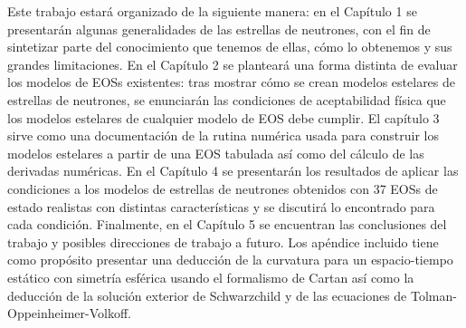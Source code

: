 Este trabajo estará organizado de la siguiente manera: en el Capítulo 1 se presentarán algunas generalidades de las estrellas de neutrones, con el fin de sintetizar parte del conocimiento que tenemos de ellas, cómo lo obtenemos y sus grandes limitaciones. En el Capítulo 2 se planteará una forma distinta de evaluar los modelos de EOSs existentes: tras mostrar cómo se crean modelos estelares de estrellas de neutrones, se enunciarán las condiciones de aceptabilidad física que los modelos estelares de cualquier modelo de EOS debe cumplir. El capítulo 3 sirve como una documentación de la rutina numérica usada para construir los modelos estelares a partir de una EOS tabulada así como del cálculo de las derivadas numéricas. En el Capítulo 4 se presentarán los resultados de aplicar las condiciones a los modelos de estrellas de neutrones obtenidos con 37 EOSs de estado realistas con distintas características y se discutirá lo encontrado para cada condición. Finalmente, en el Capítulo 5 se encuentran las conclusiones del trabajo y posibles direcciones de trabajo a futuro. Los apéndice incluido tiene como propósito presentar una deducción de la curvatura para un espacio-tiempo estático con simetría esférica usando el formalismo de Cartan así como la deducción de la solución exterior de Schwarzchild y de las ecuaciones de Tolman-Oppeinheimer-Volkoff. 

